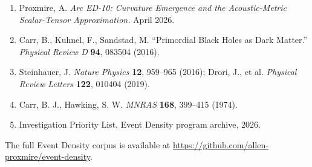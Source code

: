 \documentclass[11pt,a4paper]{article}
\begin{document}
\begin{enumerate}[leftmargin=*,itemsep=2pt]
  \item Proxmire, A. \emph{Arc ED-10: Curvature Emergence and the Acoustic-Metric Scalar-Tensor Approximation.} April 2026.
  \item Carr, B., Kuhnel, F., Sandstad, M. ``Primordial Black Holes as Dark Matter.'' \emph{Physical Review D} \textbf{94}, 083504 (2016).
  \item Steinhauer, J. \emph{Nature Physics} \textbf{12}, 959--965 (2016); Drori, J., et al. \emph{Physical Review Letters} \textbf{122}, 010404 (2019).
  \item Carr, B. J., Hawking, S. W. \emph{MNRAS} \textbf{168}, 399--415 (1974).
  \item Investigation Priority List, Event Density program archive, 2026.
\end{enumerate}

The full Event Density corpus is available at \url{https://github.com/allen-proxmire/event-density}.
\end{document}
